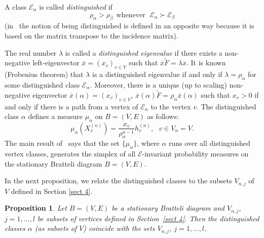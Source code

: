 \documentclass[11pt, english, reqno]{amsart}
\theoremstyle{definition}
\theoremstyle{remark}
\theoremstyle{plain}
\newtheorem{prop}[defin]{Proposition}
\def\ov{\overline}
\def\tl{\widetilde}
\numberwithin{equation}{section}
\begin{document}
{A class $\mathcal{E}_{\alpha}$ is called \textit{distinguished} if
\begin{equation}\label{eq disting class}
\rho_{\alpha} > \rho_{\beta} \ \ \mathrm{whenever} \ \ \
\mathcal{E}_{\alpha} \succ \mathcal{E}_{\beta}
\end{equation}
(in~\cite{BezuglyiKwiatkowskiMedynetsSolomyak2010} the notion of being
distinguished is defined in an opposite way because it is based on the matrix
transpose to the incidence matrix).

The real number $\lambda$ is called a \textit{distinguished eigenvalue} if
 there exists a non-negative left-eigenvector $\ov x = (x_v)_{v \in V}$ such
 that $\ov x \tl F = \lambda \ov x$. It is known (Frobenius theorem) that $
 \lambda$ is a distinguished eigenvalue if and only if $\lambda =
 \rho_{\alpha}$ for some distinguished class $\mathcal{E}_{\alpha}$.
 Moreover, there is a unique (up to scaling) non-negative eigenvector
 $\ov  x(\alpha) = (x_v)_{v \in V}$, $\ov x(\alpha)\tl F = \rho_{\alpha}
 \ov  x(\alpha)$ such that $x_v > 0$ if and only if there is a path from a
  vertex  of $\mathcal{E}_\alpha$ to the vertex $v$. The distinguished class
   $\alpha$ defines a measure $\mu_{\alpha}$ on $B = (V,E)$ as follows:
$$
\mu_{\alpha}(X_v^{(n)}) = \frac{x_v}{\rho_{\alpha}^{n-1}} h_v^{(n)}, \ \
\ v \in V_n = V.
$$
The main result of~\cite{BezuglyiKwiatkowskiMedynetsSolomyak2010} says
 that the set $\{\mu_{\alpha}\}$, where $\alpha$ runs over all distinguished
 vertex classes, generates the simplex of  all  $\mathcal E$-invariant
 probability  measures on the stationary Bratteli diagram $B = (V,E)$.

In the next proposition, we relate the distinguished classes to the
subsets $V_{n,j}$ of $V$ defined in Section \ref{sect 4}.

\begin{prop} Let $B = (V,E)$ be a stationary Bratteli diagram and $V_{n,j}$, $j = 1,\ldots,l$ be subsets of vertices defined in Section~\ref{sect 4}. Then the distinguished classes $\alpha$ (as subsets of $V$)
coincide with the sets $V_{n,j}$, $j = 1,\ldots,l$.
\end{prop}

}
\end{document}
